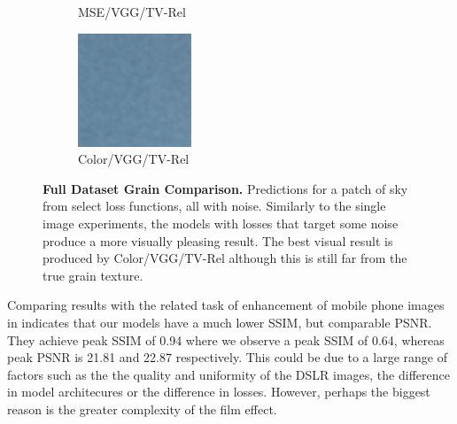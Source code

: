 \begin{figure}
\begin{subfigure}[t]{.19\textwidth}
        \captionsetup{justification=centering}
        \caption{MSE/VGG/TV-Rel}
      \end{subfigure}
      \begin{subfigure}[t]{.19\textwidth}
        \centering
        \includegraphics[width=\linewidth]{figures/color-vgg-tv-rel-sky.png}
        \captionsetup{justification=centering}
        \caption{Color/VGG/TV-Rel}
      \end{subfigure}
    \caption{\textbf{Full Dataset Grain Comparison.} Predictions for a patch of sky from select loss functions, all with noise. Similarly to the single image experiments, the models with losses that target some noise produce a more visually pleasing result. The best visual result is produced by Color/VGG/TV-Rel although this is still far from the true grain texture.}
    \label{fig:full-data-grain}
\end{figure}


Comparing results with the related task of enhancement of mobile phone images in \cite{dslr-quality} indicates that our models have a much lower SSIM, but comparable PSNR. They achieve peak SSIM of 0.94 where we observe a peak SSIM of 0.64, whereas peak PSNR is 21.81 and 22.87 respectively. This could be due to a large range of factors such as the the quality and uniformity of the DSLR images, the difference in model architecures or the difference in losses. However, perhaps the biggest reason is the greater complexity of the film effect.

